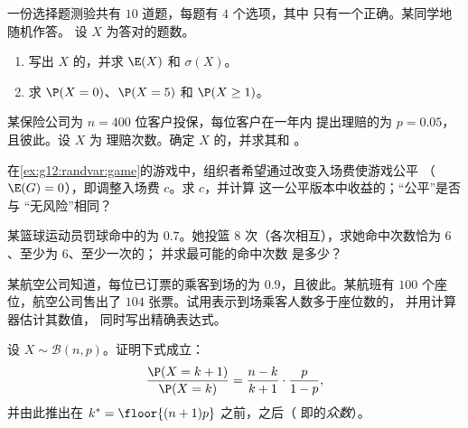 \begin{exercise}[$\star$]\label{exo:g12:randvar:2}
一份选择题测验共有 $10$ 道题，每题有 $4$ 个选项，其中
只有一个正确。某同学地随机作答。
设 $X$ 为答对的题数。
\begin{enumerate}
  \item 写出 $X$ 的，并求 $\E(X)$ 和 $\sigma(X)$。
  \item 求 $\P(X = 0)$、$\P(X = 5)$ 和 $\P(X \geq 1)$。
\end{enumerate}
\end{exercise}

\begin{exercise}[$\star$]\label{exo:g12:randvar:3}
某保险公司为 $n = 400$ 位客户投保，每位客户在一年内
提出理赔的为 $p = 0.05$，且彼此。设 $X$ 为
理赔次数。确定 $X$ 的，并求其和
。
\end{exercise}

\begin{exercise}[$\star\star$]\label{exo:g12:randvar:4}
在\cref{ex:g12:randvar:game}的游戏中，组织者希望通过改变入场费使游戏公平
（$\E(G) = 0$），即调整入场费 $c$。求 $c$，并计算
这一公平版本中收益的；“公平”是否与
“无风险”相同？
\end{exercise}

\begin{exercise}[$\star\star$]\label{exo:g12:randvar:5}
某篮球运动员罚球命中的为 $0.7$。她投篮
$8$ 次（各次相互），求她命中次数恰为 $6$、至少为 $6$、至少一次的；
并求最可能的命中次数
是多少？
\end{exercise}

\begin{exercise}[$\star\star$]\label{exo:g12:randvar:6}
某航空公司知道，每位已订票的乘客到场的为
$0.9$，且彼此。某航班有 $100$ 个座位，航空公司售出了 $104$
张票。试用表示到场乘客人数多于座位数的，
并用计算器估计其数值，
同时写出精确表达式。
\end{exercise}

\begin{exercise}[$\star\star$]\label{exo:g12:randvar:7}
设 $X \sim \mathcal B(n, p)$。证明下式成立：
\[
\frac{\P(X = k+1)}{\P(X = k)} = \frac{n-k}{k+1}\cdot\frac{p}{1-p},
\]
并由此推出在
$k^* = \floor{(n+1)p}$ 之前，之后（
即的\emph{众数}）。
\end{exercise}

